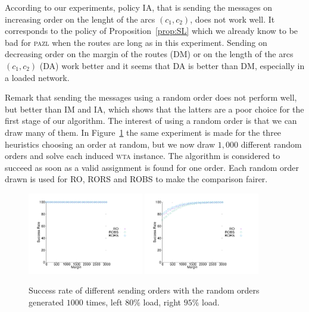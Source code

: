 \documentclass[a4paper,10pt]{article}
\newcommand\pazl{\textsc{pazl}\xspace}
\newcommand\wta{\textsc{wta}\xspace}
\begin{document}
          
     According to our experiments, policy IA, that is sending the messages on increasing order on the lenght of the arcs $(c_1,c_2)$, does not work well. It corresponds to the policy of Proposition~\ref{prop:SL} which we already know to be bad for \pazl when the routes are long as in this experiment. Sending on decreasing order on the margin of the routes (DM) or on the length of the arcs $(c_1,c_2)$ (DA) work better and it seems that DA is better than DM, especially in a loaded network. 
     
     Remark that sending the messages using a random order does not perform well,
     but better than IM and IA, which shows that the latters are a poor choice for the first stage of our algorithm. The interest of using a random order is that we can draw many of them. In Figure~\ref{fig:success1000random} the same experiment is made for the three heuristics choosing an order at random, but we now draw $1,000$ different random orders and solve each induced \wta instance. The algorithm is considered to succeed as soon as a valid assignment is found for one order. Each random order drawn is used for RO, RORS and ROBS to make the comparison fairer.
 
\begin{figure}[h] 
  \centering
  \includegraphics[width=0.45\textwidth]{departs_gp_25000.pdf}
    \includegraphics[width=0.45\textwidth]{departs_gp_21000.pdf}
    
       \caption{Success rate of different sending orders with the random orders generated $1000$ times, left $80\%$ load, right $95\%$ load.}
      \label{fig:success1000random}
          \end{figure}
\end{document}
